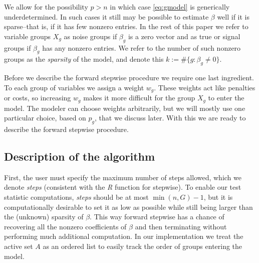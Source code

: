 \documentclass{imsart}
\newcommand{\argmax}{\mathop{\mathrm{argmax}}}
\newcommand{\norm}[1]{\lVert #1 \rVert}
\begin{document}
We allow for the possibility $p > n$ in which case \eqref{eq:gmodel} is
generically underdetermined. In such cases it still may be possible to
estimate $\beta$ well if it is sparse--that is, if it has few nonzero
entries. In the rest of this paper we refer to variable groups $X_g$
as noise groups if $\beta_g$ is a zero vector and as true or signal
groups if $\beta_g$ has any nonzero entries. We refer to the number
of such nonzero groups as the \textit{sparsity} of the model, and
denote this $k := \# \{ g : \beta_g \neq 0 \}$.

Before we describe the forward stepwise procedure we require one last
ingredient. To each group of variables we assign a weight $w_g$. These
weights act like penalties or costs, so increasing $w_g$ makes it
more difficult for the group $X_g$ to enter the model. The
modeler can choose weights arbitrarily, but we will mostly use one
particular choice, based on $p_g$, that we discuss later. With this we
are ready to describe the forward stepwise procedure.


\subsection{Description of the algorithm}

First, the user must specify the maximum number of steps allowed,
which we denote \textit{steps} (consistent with the \textit{R} function
for stepwise). To enable our test statistic computations,
\textit{steps} should be at most $\min (n, G) - 1$, but it is
computationally desirable to set it as low as possible while still being
larger than the (unknown) sparsity of $\beta$.
This way forward stepwise has a chance of recovering all the nonzero
coefficients of $\beta$ and then terminating without performing much
additional computation.
In our implementation we treat the active set $A$ as an ordered list to easily track the order of groups entering the model.

\end{document}
